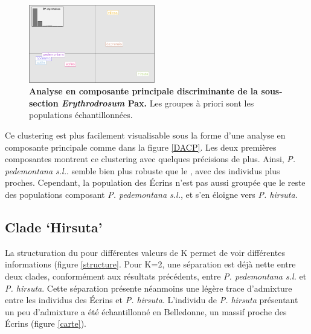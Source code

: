 \begin{figure}
	\vspace{-20pt}
	\begin{center}
    \includegraphics[width=0.49\textwidth]{fig/DAPC.png}
    \caption{\textbf{Analyse en composante principale discriminante de la sous-section \textit{Erythrodrosum} Pax.} Les groupes à priori sont les populations échantillonnées.}
    \end{center}
    \label{DAPC}
    \vspace{-20pt}
\end{figure}

Ce clustering est plus facilement visualisable sous la forme d'une analyse en composante principale comme dans la figure \ref{DACP}. Les deux premières composantes montrent ce clustering avec quelques précisions de plus. Ainsi, \textit{P. pedemontana s.l.}. semble bien plus robuste que le , avec des individus plus proches. Cependant, la population des Écrins n'est pas aussi groupée que le reste des populations composant \textit{P. pedemontana s.l.}, et s'en éloigne vers \textit{P. hirsuta}.

\subsection{Clade `Hirsuta'}

La structuration du  pour différentes valeurs de K permet de voir différentes informations (figure \ref{structure}. Pour K=2, une séparation est déjà nette entre deux clades, conformément aux résultats précédents, entre \textit{P. pedemontana s.l.} et \textit{P. hirsuta}. Cette séparation présente néanmoins une légère trace d'admixture entre les individus des Écrins et \textit{P. hirsuta}. L'individu de \textit{P. hirsuta} présentant un peu d'admixture a été échantillonné en Belledonne, un massif proche des Écrins (figure \ref{carte}).

